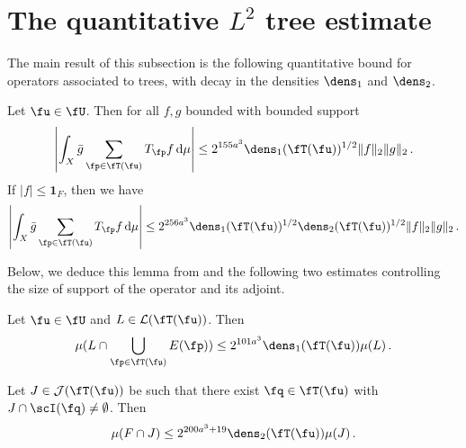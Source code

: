 \section{The quantitative \texorpdfstring{$L^2$}{L2} tree estimate}

The main result of this subsection is the following quantitative bound for operators associated to trees, with decay in the densities $\dens_1$ and $\dens_2$.

\begin{lemma}
    \label{densities-tree-bound}
    Let $\fu \in \fU$. Then for all $f,g$ bounded with bounded support
    \begin{equation}
        \label{eq-cor-tree-est}
        \left|\int_X \bar g \sum_{\fp \in \fT(\fu)} T_{\fp }f \, \mathrm{d}\mu \right| \le 2^{155a^3} \dens_1(\fT(\fu))^{1/2} \|f\|_2\|g\|_2\,.
    \end{equation}
    If $|f| \le \mathbf{1}_F$, then we have
    \begin{equation}
        \label{eq-cor-tree-est-F}
        \left| \int_X \bar g \sum_{\fp \in \fT(\fu)} T_{\fp }f\, \mathrm{d}\mu \right| \le 2^{256a^3} \dens_1(\fT(\fu))^{1/2} \dens_2(\fT(\fu))^{1/2} \|f\|_2\|g\|_2\,.
    \end{equation}
\end{lemma}

Below, we deduce this lemma from  and the following two estimates controlling the size of support of the operator and its adjoint.

\begin{lemma}
    \label{local-dens1-tree-bound}
    Let $\fu \in \fU$ and $L \in \mathcal{L}(\fT(\fu))$. Then
    \begin{equation}
    \label{eq-1density-estimate-tree}
        \mu(L \cap \bigcup_{\fp \in \fT(\fu)} E(\fp)) \le 2^{101a^3} \dens_1(\fT(\fu)) \mu(L)\,.
    \end{equation}
\end{lemma}

\begin{lemma}
    \label{local-dens2-tree-bound}
    Let $J \in \mathcal{J}(\fT(\fu))$ be such that there exist $\fq \in \fT(\fu)$ with $J \cap \scI(\fq) \ne \emptyset$. Then
    $$
        \mu(F \cap J) \le 2^{200a^3 + 19} \dens_2(\fT(\fu)) \mu(J)\,.
    $$
\end{lemma}

